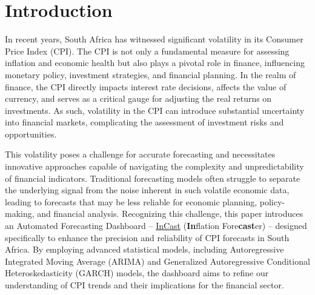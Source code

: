\documentclass[11pt,preprint, authoryear]{elsarticle}
\numberwithin{equation}{section}
\numberwithin{figure}{section}
\numberwithin{table}{section}
\begin{document}
\setcounter{footnote}{0}


\renewcommand{\contentsname}{Table of Contents}
{\tableofcontents}

\pagestyle{fancy}
\chead{}
\rhead{}
\lfoot{}
\lhead{}
\cfoot{}


\headsep 35pt %




\hypertarget{introduction}{%
\section{\texorpdfstring{Introduction
\label{Intro}}{Introduction }}\label{introduction}}

In recent years, South Africa has witnessed significant volatility in
its Consumer Price Index (CPI). The CPI is not only a fundamental
measure for assessing inflation and economic health but also plays a
pivotal role in finance, influencing monetary policy, investment
strategies, and financial planning. In the realm of finance, the CPI
directly impacts interest rate decisions, affects the value of currency,
and serves as a critical gauge for adjusting the real returns on
investments. As such, volatility in the CPI can introduce substantial
uncertainty into financial markets, complicating the assessment of
investment risks and opportunities.

This volatility poses a challenge for accurate forecasting and
necessitates innovative approaches capable of navigating the complexity
and unpredictability of financial indicators. Traditional forecasting
models often struggle to separate the underlying signal from the noise
inherent in such volatile economic data, leading to forecasts that may
be less reliable for economic planning, policy-making, and financial
analysis. Recognizing this challenge, this paper introduces an Automated
Forecasting Dashboard --
\href{https://janpretorius.shinyapps.io/incast/}{InCast}
(\textbf{In}flation Fore\textbf{cast}er) -- designed specifically to
enhance the precision and reliability of CPI forecasts in South Africa.
By employing advanced statistical models, including Autoregressive
Integrated Moving Average (ARIMA) and Generalized Autoregressive
Conditional Heteroskedasticity (GARCH) models, the dashboard aims to
refine our understanding of CPI trends and their implications for the
financial sector.
\end{document}
